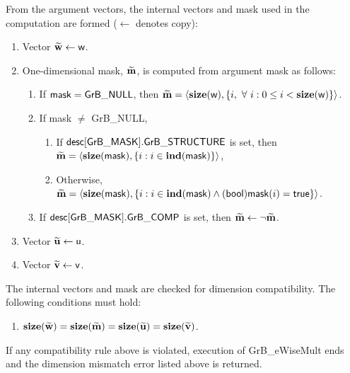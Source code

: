 From the argument vectors, the internal vectors and mask used in 
the computation are formed ($\leftarrow$ denotes copy):
\begin{enumerate}
	\item Vector ${\bf \widetilde{w}} \leftarrow {\sf w}$.

	\item One-dimensional mask, ${\bf \widetilde{m}}$, is computed from 
    argument {\sf mask} as follows:
	\begin{enumerate}
		\item If ${\sf mask} = {\sf GrB\_NULL}$, then ${\bf \widetilde{m}} = 
        \langle \bold{size}({\sf w}), \{i, \ \forall \ i : 0 \leq i < 
        \bold{size}({\sf w}) \} \rangle$.

		\item If {\sf mask} $\ne$ {\sf GrB\_NULL},  
        \begin{enumerate}
            \item If ${\sf desc[GrB\_MASK].GrB\_STRUCTURE}$ is set, then
            ${\bf \widetilde{m}} = 
            \langle \bold{size}({\sf mask}), \{i : i \in \bold{ind}({\sf mask}) \} \rangle$,
            \item Otherwise, ${\bf \widetilde{m}} = 
            \langle \bold{size}({\sf mask}), \{i : i \in \bold{ind}({\sf mask}) \wedge
            ({\sf bool}){\sf mask}(i) = {\sf true} \} \rangle$.
        \end{enumerate}

		\item	If ${\sf desc[GrB\_MASK].GrB\_COMP}$ is set, then 
        ${\bf \widetilde{m}} \leftarrow \neg {\bf \widetilde{m}}$.
	\end{enumerate}

	\item Vector ${\bf \widetilde{u}} \leftarrow {\sf u}$.

	\item Vector ${\bf \widetilde{v}} \leftarrow {\sf v}$.
\end{enumerate}

The internal vectors and mask are checked for dimension compatibility. The following 
conditions must hold:
\begin{enumerate}
	\item $\bold{size}({\bf \widetilde{w}}) = \bold{size}({\bf \widetilde{m}})
    = \bold{size}({\bf \widetilde{u}}) = \bold{size}({\bf \widetilde{v}})$.
\end{enumerate}
If any compatibility rule above is violated, execution of {\sf GrB\_eWiseMult} ends and 
the dimension mismatch error listed above is returned.

